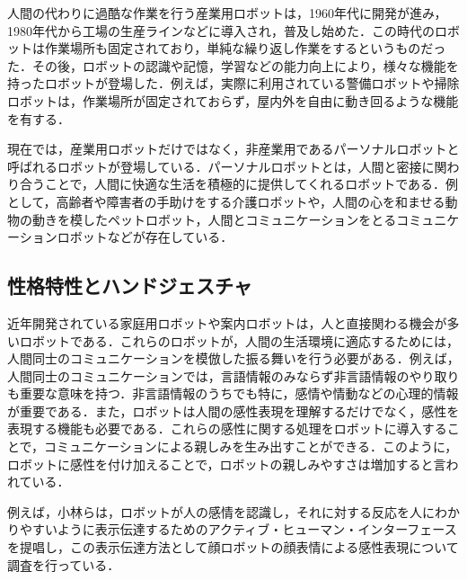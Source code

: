 人間の代わりに過酷な作業を行う産業用ロボットは，1960年代に開発が進み，1980年代から工場の生産ラインなどに導入され，普及し始めた．この時代のロボットは作業場所も固定されており，単純な繰り返し作業をするというものだった．その後，ロボットの認識や記憶，学習などの能力向上により，様々な機能を持ったロボットが登場した．例えば，実際に利用されている警備ロボットや掃除ロボットは，作業場所が固定されておらず，屋内外を自由に動き回るような機能を有する．

現在では，産業用ロボットだけではなく，非産業用であるパーソナルロボットと呼ばれるロボットが登場している．パーソナルロボットとは，人間と密接に関わり合うことで，人間に快適な生活を積極的に提供してくれるロボットである\cite{perso}．例として，高齢者や障害者の手助けをする介護ロボットや，人間の心を和ませる動物の動きを模したペットロボット，人間とコミュニケーションをとるコミュニケーションロボットなどが存在している．




\subsection{性格特性とハンドジェスチャ}
\label{sec2.3.2}

近年開発されている家庭用ロボットや案内ロボットは，人と直接関わる機会が多いロボットである．これらのロボットが，人間の生活環境に適応するためには，人間同士のコミュニケーションを模倣した振る舞いを行う必要がある．例えば，人間同士のコミュニケーションでは，言語情報のみならず非言語情報のやり取りも重要な意味を持つ\cite{gengo}．非言語情報のうちでも特に，感情や情動などの心理的情報が重要である．また，ロボットは人間の感性表現を理解するだけでなく，感性を表現する機能も必要である．これらの感性に関する処理をロボットに導入することで，コミュニケーションによる親しみを生み出すことができる．このように，ロボットに感性を付け加えることで，ロボットの親しみやすさは増加すると言われている．

例えば，小林らは，ロボットが人の感情を認識し，それに対する反応を人にわかりやすいように表示伝達するためのアクティブ・ヒューマン・インターフェースを提唱し，この表示伝達方法として顔ロボットの顔表情による感性表現について調査を行っている\cite{gengo}．






\vspace{1cm}
\begin{figure}[!h]
 \begin{center}
  \centering
  \label{fig:kansei}
 \end{center}
\end{figure}

